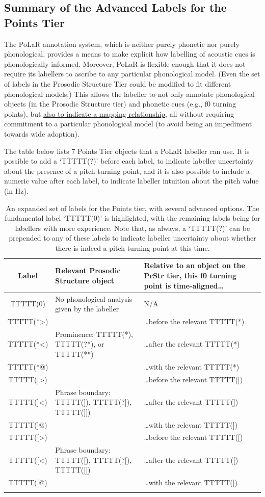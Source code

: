\documentclass[11pt, twoside]{memoir}
\begin{document}
\subsection{Summary of the Advanced Labels for the Points Tier}\label{sec:summary-of-the-points-tier}

The PoLaR annotation system, which is neither purely phonetic nor purely phonological, provides a means to make explicit how labelling of acoustic cues is phonologically informed. Moreover, PoLaR is flexible enough that it does not require its labellers to ascribe to any particular phonological model. (Even the set of labels in the Prosodic Structure Tier could be modified to fit different phonological models.) This allows the labeller to not only annotate phonological objects (in the Prosodic Structure tier) and phonetic cues (e.g., f0 turning points), but \uline{also to indicate a mapping relationship}, all without requiring commitment to a particular phonological model (to avoid being an impediment towards wide adoption).

The table below lists 7 Points Tier objects that a PoLaR labeller can use. It is possible to add a ‘TTTTT(?)’ before each label, to indicate labeller uncertainty about the presence of a pitch turning point, and it is also possible to include a numeric value after each label, to indicate labeller intuition about the pitch value (in Hz).

\begin{longtable}{c>{\centering}p{.33\linewidth}>{\centering\arraybackslash}p{.45\linewidth}} \toprule \textbf{Label} & \textbf{Relevant Prosodic Structure object} & \textbf{Relative to an object on the PrStr tier, this f0 turning point is time-aligned…}\tabularnewline
\midrule \endhead
\rowcolor{green}TTTTT(0) & No phonological analysis given by the labeller & N/A\tabularnewline
\midrule
TTTTT(*>) & & …before the relevant TTTTT(*)\tabularnewline
TTTTT(*<) & Prominence: TTTTT(*), TTTTT(?*), or TTTTT(**) & …after the relevant TTTTT(*)\tabularnewline
TTTTT(*@) & & …with the relevant TTTTT(*)\tabularnewline
\midrule
TTTTT(]>) & & …before the relevant TTTTT(])\tabularnewline
TTTTT(]<) & Phrase boundary: TTTTT(]), TTTTT(?]), TTTTT(]]) & …after the relevant TTTTT(])\tabularnewline
TTTTT(]@) & & …with the relevant TTTTT(])\tabularnewline
\midrule
TTTTT([>) & & …before the relevant TTTTT([)\tabularnewline
TTTTT([<) & Phrase boundary: TTTTT([), TTTTT(?[), TTTTT([[) & …after the relevant TTTTT([)\tabularnewline
TTTTT([@) & & …with the relevant TTTTT([)\tabularnewline
\bottomrule
\caption[An expanded set of labels for the Points tier, with several advanced options.]{An expanded set of labels for the Points tier, with several advanced options. The fundamental label ‘TTTTT(0)’ is highlighted, with the remaining labels being for labellers with more experience. Note that, as always, a ‘TTTTT(?)’ can be prepended to any of these labels to indicate labeller uncertainty about whether there is indeed a pitch turning point at this time.}
\end{longtable}
\end{document}
